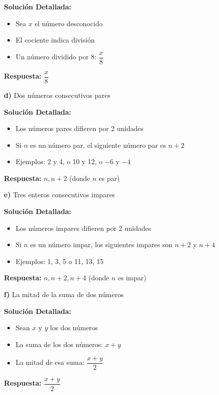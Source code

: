 \textbf{Solución Detallada:}
\begin{itemize}
    \item Sea $x$ el número desconocido
    \item El cociente indica división
    \item Un número dividido por 8: $\dfrac{x}{8}$
\end{itemize}

\textbf{Respuesta:} $\dfrac{x}{8}$

\medskip

\textbf{d)} Dos números consecutivos pares

\textbf{Solución Detallada:}
\begin{itemize}
    \item Los números pares difieren por 2 unidades
    \item Si $n$ es un número par, el siguiente número par es $n + 2$
    \item Ejemplos: 2 y 4, o 10 y 12, o $-6$ y $-4$
\end{itemize}

\textbf{Respuesta:} $n, n+2$ (donde $n$ es par)

\medskip

\textbf{e)} Tres enteros consecutivos impares

\textbf{Solución Detallada:}
\begin{itemize}
    \item Los números impares difieren por 2 unidades
    \item Si $n$ es un número impar, los siguientes impares son $n+2$ y $n+4$
    \item Ejemplos: 1, 3, 5 o 11, 13, 15
\end{itemize}

\textbf{Respuesta:} $n, n+2, n+4$ (donde $n$ es impar)

\medskip

\textbf{f)} La mitad de la suma de dos números

\textbf{Solución Detallada:}
\begin{itemize}
    \item Sean $x$ y $y$ los dos números
    \item La suma de los dos números: $x + y$
    \item La mitad de esa suma: $\dfrac{x + y}{2}$
\end{itemize}

\textbf{Respuesta:} $\dfrac{x + y}{2}$

\hrulefill

